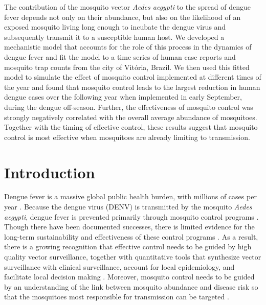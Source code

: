 \documentclass[10pt,letterpaper]{article}
\begin{document}
The contribution of the mosquito vector \emph{Aedes aegypti} to the spread of dengue fever depends not only on their abundance, but also on the likelihood of an exposed mosquito living long enough to incubate the dengue virus and subsequently transmit it to a susceptible human host.
We developed a mechanistic model that accounts for the role of this process in the dynamics of dengue fever and fit the model to a time series of human case reports and mosquito trap counts from the city of Vit\'oria, Brazil.
We then used this fitted model to simulate the effect of mosquito control implemented at different times of the year and found that mosquito control leads to the largest reduction in human dengue cases over the following year when implemented in early September, during the dengue off-season.
Further, the effectiveness of mosquito control was strongly negatively correlated with the overall average abundance of mosquitoes.
Together with the timing of effective control, these results suggest that mosquito control is most effective when mosquitoes are already limiting to transmission.

\linenumbers


\section*{Introduction}

Dengue fever is a massive global public health burden, with millions of cases per year \cite{Bhatt2013}.  
Because the dengue virus (DENV) is transmitted by the mosquito \textit{Aedes aegypti}, dengue fever is prevented primarily through mosquito control programs \cite{Achee2015}.
Though there have been documented successes, there is limited evidence for the long-term sustainability and effectiveness of these control programs \cite{Morrison2008}.
As a result, there is a growing recognition that effective control needs to be guided by high quality vector surveillance, together with quantitative tools that synthesize vector surveillance with clinical surveillance, account for local epidemiology, and facilitate local decision making \cite{Morrison2008, Scott2010b}.
Moreover, mosquito control needs to be guided by an understanding of the link between mosquito abundance and disease risk so that the mosquitoes most responsible for transmission can be targeted \cite{Scott2010a, Scott2010b}.
\end{document}
